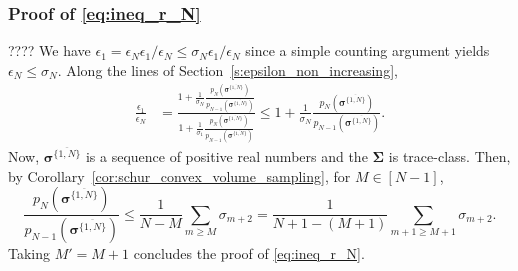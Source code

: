 \documentclass[twoside,11pt]{book}
\numberwithin{theorem}{chapter}
\numberwithin{definition}{chapter}
\numberwithin{proposition}{chapter}
\numberwithin{corollary}{chapter}
\numberwithin{example}{chapter}
\numberwithin{lemma}{chapter}
\begin{document}
\subsubsection{Proof of \eqref{eq:ineq_r_N}}\label{app:proof_ineq_r_N}
????
We have
$\epsilon_{1} = \epsilon_{N}\epsilon_{1}/\epsilon_{N} \leq \sigma_{N} \epsilon_{1}/\epsilon_{N}$ since a simple counting argument yields $ \epsilon_{N} \leq \sigma_{N}$.
Along the lines of Section~\ref{s:epsilon_non_increasing},
\begin{align}
\frac{\epsilon_{1}}{\epsilon_{N}} & = \frac{1  + \frac{1}{\sigma_{N}}\frac{p_{N} \left(\bm{\sigma}^{\overline{\{1,N \}}} \right) }{ p_{N-1} \left(\bm{\sigma}^{\overline{\{1,N \}}} \right)} }{1  + \frac{1}{\sigma_{1} }\frac{p_{N} \left(\bm{\sigma}^{\overline{\{1,N \}}} \right) }{p_{N-1} \left(\bm{\sigma}^{\overline{\{1,N \}}} \right)}}
\leq 1  + \frac{1}{\sigma_{N}}\frac{p_{N} \left(\bm{\sigma}^{\overline{\{1,N \}}} \right) }{ p_{N-1} \left(\bm{\sigma}^{\overline{\{1,N \}}} \right)}.
\end{align}
Now, $\bm{\sigma}^{\overline{\{1,N \}}}$ is a sequence of positive real numbers and the $\bm{\Sigma}$ is trace-class. Then, by Corollary~\ref{cor:schur_convex_volume_sampling}, for $M \in [N-1]$,
\begin{equation}
\frac{p_{N} \left(\bm{\sigma}^{\overline{\{1,N \}}}  \right) }{ p_{N-1} \left(\bm{\sigma}^{\overline{\{1,N \}}}  \right)} \leq \frac{1 }{N-M} \sum_{ m \geq M} \sigma_{m+2} = \frac{1 }{N+1-(M+1)} \sum_{ m+1 \geq M+1} \sigma_{m+2}.
\end{equation}
Taking $M'= M+1$ concludes the proof of \eqref{eq:ineq_r_N}.


\end{document}
